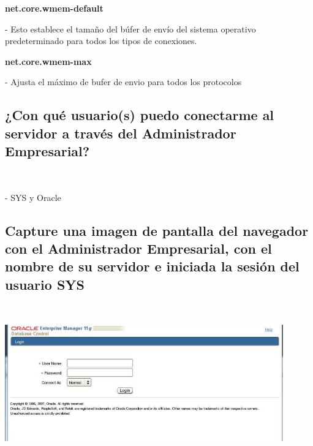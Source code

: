 \documentclass[12pt,letterpaper]{article}
\begin{document}
\textbf{net.core.wmem-default }
\begin{itemize}
- Esto establece el tamaño del búfer de envío del sistema operativo predeterminado para todos los tipos de conexiones. \\
\end{itemize}

\textbf{net.core.wmem-max}
\begin{itemize}
- Ajusta el máximo de bufer de envio para todos los protocolos \\
\end{itemize}

\subsection{¿Con qué usuario(s) puedo conectarme al servidor a través del Administrador Empresarial?}\\
\begin{itemize}
- SYS y Oracle \\
\end{itemize}

\subsection{Capture una imagen de pantalla del navegador con el Administrador Empresarial, con el nombre de su servidor e iniciada la sesión del usuario SYS}\\

\begin{center}
	\includegraphics[width=12cm]{./Imagenes/36} 
\end{center}
\end{document}
